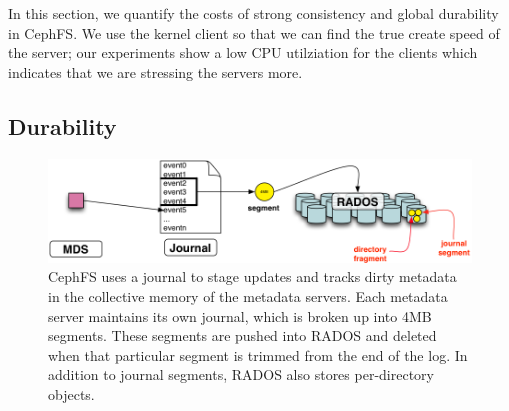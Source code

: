 In this section, we quantify the costs of strong consistency and global
durability in CephFS.  We use the kernel client so that we can find the true
create speed of the server; our experiments show a low CPU utilziation for the
clients which indicates that we are stressing the servers more. 

\subsection{Durability}
\label{sec:durability}

\begin{figure}[tb] \centering
\includegraphics[width=1\linewidth]{./figures/journal.png} 
\caption{CephFS uses a journal to stage updates and tracks dirty metadata in
the collective memory of the metadata servers. Each metadata server maintains its own journal, which is
broken up into 4MB segments. These segments are pushed into RADOS and deleted
when that particular segment is trimmed from the end of the log. In addition to
journal segments, RADOS also stores per-directory objects. \label{fig:journal}}
\end{figure}
